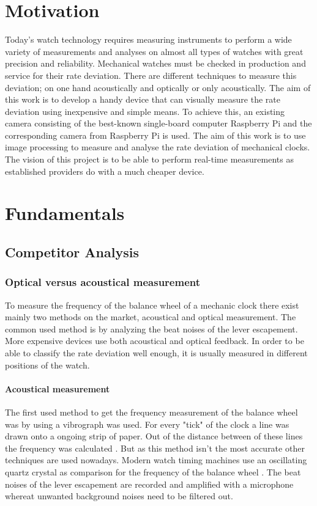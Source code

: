 \documentclass[12pt, a4paper]{report}
\begin{document}
\pagebreak
    \setcounter{secnumdepth}{5} 
    \setcounter{tocdepth}{5} 
    \tableofcontents
    \pagebreak
    
    \chapter{Motivation}
    Today's watch technology requires measuring instruments to perform a wide variety of measurements and analyses on almost all types of watches with great precision and reliability.
    Mechanical watches must be checked in production and service for their rate deviation.
    There are different techniques to measure this deviation; on one hand acoustically and optically or only acoustically.
    The aim of this work is to develop a handy device that can visually measure the rate deviation using inexpensive and simple means.
    To achieve this, an existing camera consisting of the best-known single-board computer Raspberry Pi and the corresponding camera from Raspberry Pi is used.
    The aim of this work is to use image processing to measure and analyse the rate deviation of mechanical clocks.
    The vision of this project is to be able to perform real-time measurements as established providers do with a much cheaper device.
    
    \chapter{Fundamentals}
    \section{Competitor Analysis}
    \subsection{Optical versus acoustical measurement}
    To measure the frequency of the balance wheel of a mechanic clock there exist mainly two methods on the market, acoustical and optical measurement. The common used method is by analyzing the beat noises of the lever escapement. More expensive devices use both acoustical and optical feedback. In order to be able to classify the rate deviation well enough, it is usually measured in different positions of the watch.
    
    \subsubsection{Acoustical measurement}
    The first used method to get the frequency measurement of the balance wheel was by using a vibrograph was used. For every "tick" of the clock a line was drawn onto a ongoing strip of paper. Out of the distance between of these lines the frequency was calculated \cite{Zeitwaage}. But as this method isn't the most accurate other techniques are used nowadays.  
    Modern watch timing machines use an oscillating quartz crystal as comparison for the frequency of the balance wheel \cite{Zeitwaage}. The beat noises of the lever escapement are recorded and amplified with a microphone whereat unwanted background noises need to be filtered out. 
    
\end{document}
